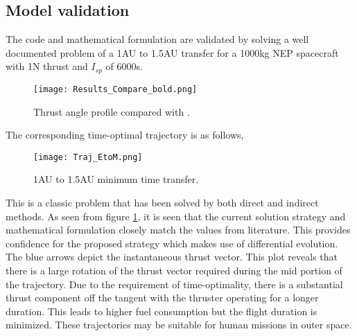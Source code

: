 \subsection{Model validation}
The code and mathematical formulation are validated by solving a well documented problem of a 1AU to 1.5AU transfer for a 1000kg NEP spacecraft with 1N thrust and $I_{sp}$ of 6000s. 
\begin{figure}[H]
	\centering\texttt{[image: Results\_Compare\_bold.png]}
	\caption{Thrust angle profile compared with \cite{kim_continuous_2005}.}
	\label{validate_fig}
\end{figure}
The corresponding time-optimal trajectory is as follows,
\begin{figure}[H]
	\centering\texttt{[image: Traj\_EtoM.png]}
	\caption{1AU to 1.5AU minimum time transfer.}
	\label{validate_traj}
\end{figure}
This is a classic problem that has been solved by both direct \citep{arthur._e_applied_1975} and indirect \citep{kim_continuous_2005} methods. As seen from figure \ref{validate_fig}, it is seen that the current solution strategy and mathematical formulation closely match the values from literature. This provides confidence for the proposed strategy which makes use of differential evolution.
The blue arrows depict the instantaneous thrust vector. This plot reveals that there is a large rotation of the thrust vector required during the mid portion of the trajectory. Due to the requirement of time-optimality, there is a substantial thrust component off the tangent with the thruster operating for a longer duration. This leads to higher fuel consumption but the flight duration is minimized. These trajectories may be suitable for human missions in outer space.
